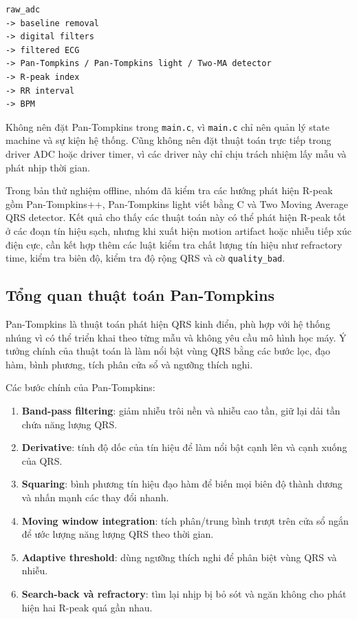 \begin{verbatim}
raw_adc
-> baseline removal
-> digital filters
-> filtered ECG
-> Pan-Tompkins / Pan-Tompkins light / Two-MA detector
-> R-peak index
-> RR interval
-> BPM
\end{verbatim}

Không nên đặt Pan-Tompkins trong \texttt{main.c}, vì \texttt{main.c} chỉ nên
quản lý state machine và sự kiện hệ thống. Cũng không nên đặt thuật toán trực
tiếp trong driver ADC hoặc driver timer, vì các driver này chỉ chịu trách nhiệm
lấy mẫu và phát nhịp thời gian.

Trong bản thử nghiệm offline, nhóm đã kiểm tra các hướng phát hiện R-peak gồm
Pan-Tompkins++, Pan-Tompkins light viết bằng C và Two Moving Average QRS
detector. Kết quả cho thấy các thuật toán này có thể phát hiện R-peak tốt ở các
đoạn tín hiệu sạch, nhưng khi xuất hiện motion artifact hoặc nhiễu tiếp xúc điện
cực, cần kết hợp thêm các luật kiểm tra chất lượng tín hiệu như refractory time,
kiểm tra biên độ, kiểm tra độ rộng QRS và cờ \texttt{quality\_bad}.

\subsection{Tổng quan thuật toán Pan-Tompkins}

Pan-Tompkins là thuật toán phát hiện QRS kinh điển, phù hợp với hệ thống nhúng
vì có thể triển khai theo từng mẫu và không yêu cầu mô hình học máy. Ý tưởng
chính của thuật toán là làm nổi bật vùng QRS bằng các bước lọc, đạo hàm, bình
phương, tích phân cửa sổ và ngưỡng thích nghi.

Các bước chính của Pan-Tompkins:

\begin{enumerate}
    \item \textbf{Band-pass filtering}: giảm nhiễu trôi nền và nhiễu cao tần,
    giữ lại dải tần chứa năng lượng QRS.
    \item \textbf{Derivative}: tính độ dốc của tín hiệu để làm nổi bật cạnh lên
    và cạnh xuống của QRS.
    \item \textbf{Squaring}: bình phương tín hiệu đạo hàm để biến mọi biên độ
    thành dương và nhấn mạnh các thay đổi nhanh.
    \item \textbf{Moving window integration}: tích phân/trung bình trượt trên
    cửa sổ ngắn để ước lượng năng lượng QRS theo thời gian.
    \item \textbf{Adaptive threshold}: dùng ngưỡng thích nghi để phân biệt vùng
    QRS và nhiễu.
    \item \textbf{Search-back và refractory}: tìm lại nhịp bị bỏ sót và ngăn
    không cho phát hiện hai R-peak quá gần nhau.
\end{enumerate}


